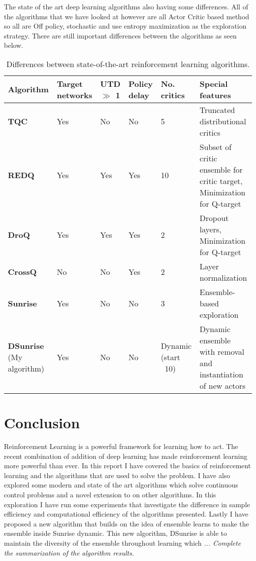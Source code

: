 The state of the art deep learning algorithms also having some differences. All of the algorithms that we have looked at however are all Actor Critic based method so all are Off policy, stochastic and use entropy maximization as the exploration strategy. There are still important differences between the algorithms as seen below.

\begin{table}[H]
    \footnotesize
    \centering
    \renewcommand{\arraystretch}{1.4} %
    \begin{tabularx}{\textwidth}{X | X X X X p{}}
        \hline
        \textbf{Algorithm} & \textbf{Target networks} & \textbf{UTD $\gg$ 1} & \textbf{Policy delay} & \textbf{No. critics} & \textbf{Special features} \\
        \hline
        \textbf{TQC}     & Yes & No  & No  & 5 & Truncated distributional critics \\
        \textbf{REDQ}    & Yes & Yes & Yes & 10 & Subset of critic ensemble for critic target, Minimization for Q-target \\
        \textbf{DroQ}    & Yes & Yes & Yes & 2 & Dropout layers, Minimization for Q-target \\
        \textbf{CrossQ}  & No  & No  & Yes & 2 & Layer normalization \\
        \textbf{Sunrise} & Yes & No  & No & 3 & Ensemble-based exploration \\
        \textbf{DSunrise} (My algorithm) & Yes & No  & No & Dynamic (start ~10) & Dynamic ensemble with removal and instantiation of new actors \\
        \hline
    \end{tabularx}
    \caption{Differences between state-of-the-art reinforcement learning algorithms.}
\end{table}


\section{Conclusion}

Reinforcement Learning is a powerful framework for learning how to act. The recent combination of addition of deep learning has made reinforcement learning more powerful than ever. In this report I have covered the basics of reinforcement learning and the algorithms that are used to solve the problem. I have also explored some modern and state of the art algorithms which solve continuous control problems and a novel extension to on other algorithms. In this exploration I have run some experiments that investigate the difference in sample efficiency and computational efficiency of the algorithms presented. Lastly I have proposed a new algorithm that builds on the idea of ensemble learns to make the ensemble inside Sunrise dynamic. This new algorithm, DSunrise is able to maintain the diversity of the ensemble throughout learning which \textit{... Complete the summarization of the algorithm results.}

